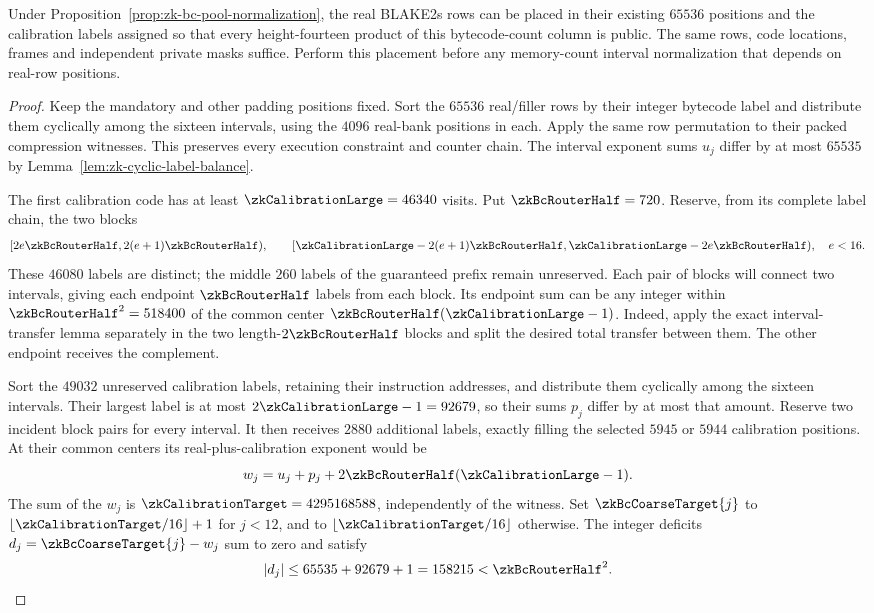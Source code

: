 \begin{theorem}\label{thm:zk-bc-coarse-normalization}
Under Proposition~\ref{prop:zk-bc-pool-normalization}, the real BLAKE2s rows can be placed in their existing $65536$ positions and the calibration labels assigned so that every height-fourteen product of this bytecode-count column is public. The same rows, code locations, frames and independent private masks suffice. Perform this placement before any memory-count interval normalization that depends on real-row positions.
\end{theorem}
\begin{proof}
Keep the mandatory and other padding positions fixed. Sort the $65536$ real/filler rows by their integer bytecode label and distribute them cyclically among the sixteen intervals, using the $4096$ real-bank positions in each. Apply the same row permutation to their packed compression witnesses. This preserves every execution constraint and counter chain. The interval exponent sums $u_j$ differ by at most $65535$ by Lemma~\ref{lem:zk-cyclic-label-balance}.

The first calibration code has at least $\zkCalibrationLarge=46340$ visits. Put $\zkBcRouterHalf=720$. Reserve, from its complete label chain, the two blocks
\[
 [2e\zkBcRouterHalf,2(e+1)\zkBcRouterHalf),\qquad
 [\zkCalibrationLarge-2(e+1)\zkBcRouterHalf,
   \zkCalibrationLarge-2e\zkBcRouterHalf),\quad e<16.
\]
These $46080$ labels are distinct; the middle $260$ labels of the guaranteed prefix remain unreserved. Each pair of blocks will connect two intervals, giving each endpoint $\zkBcRouterHalf$ labels from each block. Its endpoint sum can be any integer within $\zkBcRouterHalf^2=518400$ of the common center $\zkBcRouterHalf(\zkCalibrationLarge-1)$. Indeed, apply the exact interval-transfer lemma separately in the two length-$2\zkBcRouterHalf$ blocks and split the desired total transfer between them. The other endpoint receives the complement.

Sort the $49032$ unreserved calibration labels, retaining their instruction addresses, and distribute them cyclically among the sixteen intervals. Their largest label is at most $2\zkCalibrationLarge-1=92679$, so their sums $p_j$ differ by at most that amount. Reserve two incident block pairs for every interval. It then receives $2880$ additional labels, exactly filling the selected $5945$ or $5944$ calibration positions. At their common centers its real-plus-calibration exponent would be
\[
 w_j=u_j+p_j+2\zkBcRouterHalf(\zkCalibrationLarge-1).
\]
The sum of the $w_j$ is $\zkCalibrationTarget=4295168588$, independently of the witness. Set $\zkBcCoarseTarget{j}$ to $\lfloor\zkCalibrationTarget/16\rfloor+1$ for $j<12$, and to $\lfloor\zkCalibrationTarget/16\rfloor$ otherwise. The integer deficits $d_j=\zkBcCoarseTarget{j}-w_j$ sum to zero and satisfy
\[
 |d_j|\le65535+92679+1=158215<\zkBcRouterHalf^2.
\]


\end{proof}
